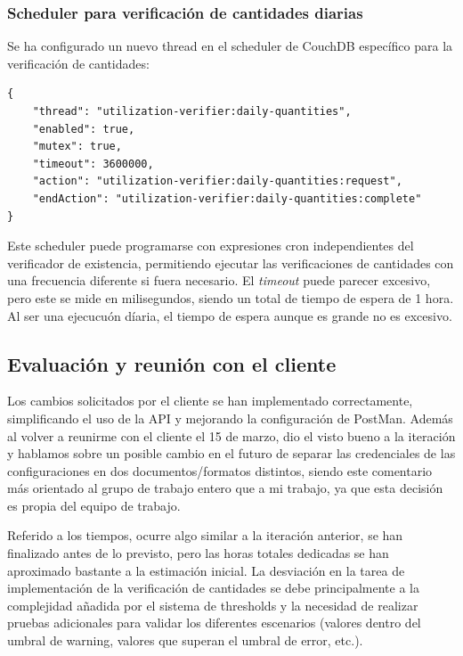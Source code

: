 \subsubsection{Scheduler para verificación de cantidades diarias}
Se ha configurado un nuevo thread en el scheduler de CouchDB específico para la verificación de cantidades:

\begin{lstlisting}[caption=Configuración del scheduler para cantidades diarias, label=lst:scheduler-quantities]
{
    "thread": "utilization-verifier:daily-quantities",
    "enabled": true,
    "mutex": true,
    "timeout": 3600000,
    "action": "utilization-verifier:daily-quantities:request",
    "endAction": "utilization-verifier:daily-quantities:complete"
}
\end{lstlisting}

Este scheduler puede programarse con expresiones cron independientes del verificador de existencia, permitiendo ejecutar las verificaciones de cantidades con una frecuencia diferente si fuera necesario. El \textit{timeout} puede parecer excesivo, pero este se mide en milisegundos, siendo un total de tiempo de espera de 1 hora. Al ser una ejecucuón díaria, el tiempo de espera aunque es grande no es excesivo.



\subsection{Evaluación y reunión con el cliente}
Los cambios solicitados por el cliente se han implementado correctamente, simplificando el uso de la API y mejorando la configuración de PostMan. Además al volver a reunirme con el cliente el 15 de marzo, dio el visto bueno a la iteración y hablamos sobre un posible cambio en el futuro de separar las credenciales de las configuraciones en dos documentos/formatos distintos, siendo este comentario más orientado al grupo de trabajo entero que a mi trabajo, ya que esta decisión es propia del equipo de trabajo.

Referido a los tiempos, ocurre algo similar a la iteración anterior, se han finalizado antes de lo previsto, pero las horas totales dedicadas se han aproximado bastante a la estimación inicial. La desviación en la tarea de implementación de la verificación de cantidades se debe principalmente a la complejidad añadida por el sistema de thresholds y la necesidad de realizar pruebas adicionales para validar los diferentes escenarios (valores dentro del umbral de warning, valores que superan el umbral de error, etc.).

